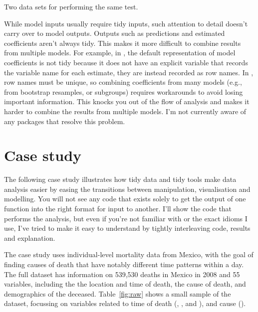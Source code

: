 \documentclass[article]{jss}
\begin{document}
\begin{table}
  \centering
  \hspace{2em}%

  \caption{Two data sets for performing the same test.}
  \label{label}
\end{table}

While model inputs usually require tidy inputs, such attention to detail doesn't carry over to model outputs. Outputs such as predictions and estimated coefficients aren't always tidy. This makes it more difficult to combine results from multiple models. For example, in , the default representation of model coefficients is not tidy because it does not have an explicit variable that records the variable name for each estimate, they are instead recorded as row names. In , row names must be unique, so combining coefficients from many models (e.g., from bootstrap resamples, or subgroups) requires workarounds to avoid losing important information. This knocks you out of the flow of analysis and makes it harder to combine the results from multiple models. I'm not currently aware of any packages that resolve this problem.

\section{Case study} 
\label{sec:case-study}

The following case study illustrates how tidy data and tidy tools make data analysis easier by easing the transitions between manipulation, visualisation and modelling. You will not see any code that exists solely to get the output of one function into the right format for input to another. I'll show the  code that performs the analysis, but even if you're not familiar with  or the exact idioms I use, I've tried to make it easy to understand by tightly interleaving code, results and explanation.

The case study uses individual-level mortality data from Mexico, with the goal of finding causes of death that have notably different time patterns within a day. The full dataset has information on 539,530 deaths in Mexico in 2008 and 55 variables, including the the location and time of death, the cause of death, and demographics of the deceased. Table~\ref{fig:raw} shows a small sample of the dataset, focussing on variables related to time of death (, ,  and ), and cause ().
\end{document}
